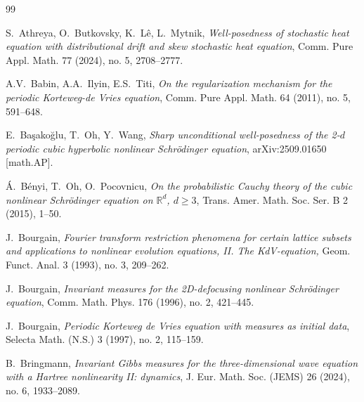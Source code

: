 \documentclass[letterpaper, 11pt,  reqno]{amsart}
\newcommand{\1}{\hspace{0.5mm}\text{I}\hspace{0.5mm}}
\newcommand{\R}{\mathbb{R}}
\numberwithin{equation}{section}
\numberwithin{theorem}{section}
\begin{document}
\begin{thebibliography}{99}




S.~Athreya, O.~Butkovsky, K.~L\^e, L.~Mytnik,
{\it Well-posedness of stochastic heat equation with distributional drift and skew stochastic heat equation},
Comm. Pure Appl. Math. 77 (2024), no. 5, 2708--2777.


A.V.~Babin, A.A.~Ilyin, E.S.~Titi,
{\it On the regularization mechanism for the periodic Korteweg-de Vries equation}, 
Comm. Pure Appl. Math. 64 (2011), no. 5, 591--648.



E.~Ba\c{s}ako\u{g}lu, T.~Oh, Y.~Wang,
{\it Sharp unconditional well-posedness of the 2-$d$ periodic cubic hyperbolic nonlinear Schr\"odinger equation},
arXiv:2509.01650 [math.AP].




\'A.~B\'enyi, T.~Oh, O.~Pocovnicu,
{\it On the probabilistic Cauchy theory of the cubic nonlinear Schr\"odinger equation on $\R^d$, $d\ge 3$}, 
Trans. Amer. Math. Soc. Ser. B 2 (2015), 1--50. 




%
%
%





J.~Bourgain, 
{\it Fourier transform restriction phenomena for certain lattice subsets and applications to nonlinear evolution equations, II. The KdV-equation,} 
 Geom. Funct. Anal. 3 (1993), no. 3, 209--262.


J.~Bourgain,
{\it Invariant measures for the 2D-defocusing nonlinear Schr\"odinger equation},
Comm. Math. Phys. 176 (1996), no. 2, 421--445.

%
J.~Bourgain, 
{\it Periodic Korteweg de Vries equation with measures as initial data}, 
 Selecta Math. (N.S.) 3 (1997), no. 2, 115--159.
%

%
%
%



B.~Bringmann, 
{\it Invariant Gibbs measures for the three-dimensional wave equation with a Hartree nonlinearity II: dynamics},
 J. Eur. Math. Soc. (JEMS) 26 (2024), no. 6, 1933--2089. 








\end{thebibliography}
\end{document}
